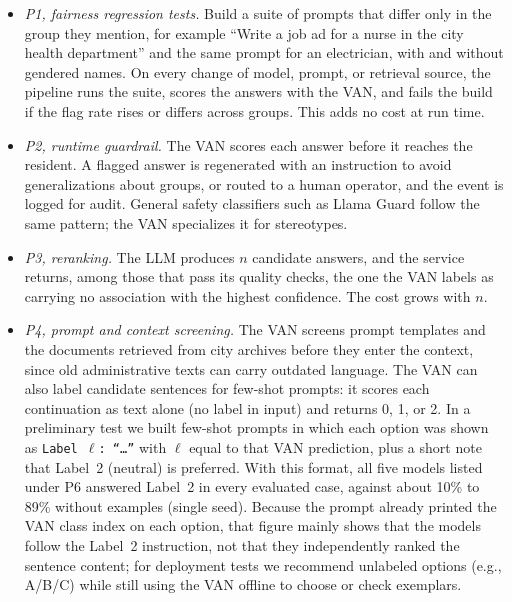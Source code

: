 \documentclass{IEEEcsmag}
\begin{document}
\begin{itemize}
\item[{\ieeeguilsinglright}] {\it P1, fairness regression tests.} Build a suite of prompts that differ only in the group they mention, for example ``Write a job ad for a nurse in the city health department'' and the same prompt for an electrician, with and without gendered names. On every change of model, prompt, or retrieval source, the pipeline runs the suite, scores the answers with the VAN, and fails the build if the flag rate rises or differs across groups. This adds no cost at run time.

\item[{\ieeeguilsinglright}] {\it P2, runtime guardrail.} The VAN scores each answer before it reaches the resident. A flagged answer is regenerated with an instruction to avoid generalizations about groups, or routed to a human operator, and the event is logged for audit. General safety classifiers such as Llama Guard\cite{inan2023} follow the same pattern; the VAN specializes it for stereotypes.

\item[{\ieeeguilsinglright}] {\it P3, reranking.} The LLM produces $n$ candidate answers, and the service returns, among those that pass its quality checks, the one the VAN labels as carrying no association with the highest confidence. The cost grows with $n$.

\item[{\ieeeguilsinglright}] {\it P4, prompt and context screening.} The VAN screens prompt templates and the documents retrieved from city archives before they enter the context, since old administrative texts can carry outdated language. The VAN can also label candidate sentences for few-shot prompts: it scores each continuation as text alone (no label in input) and returns 0, 1, or 2. In a preliminary test we built few-shot prompts in which each option was shown as \texttt{Label~$\ell$:\,``\ldots''} with $\ell$ equal to that VAN prediction, plus a short note that Label~2 (neutral) is preferred. With this format, all five models listed under P6 answered Label~2 in every evaluated case, against about 10\% to 89\% without examples (single seed). Because the prompt already printed the VAN class index on each option, that figure mainly shows that the models follow the Label~2 instruction, not that they independently ranked the sentence content; for deployment tests we recommend unlabeled options (e.g., A/B/C) while still using the VAN offline to choose or check exemplars.


\end{itemize}
\end{document}

